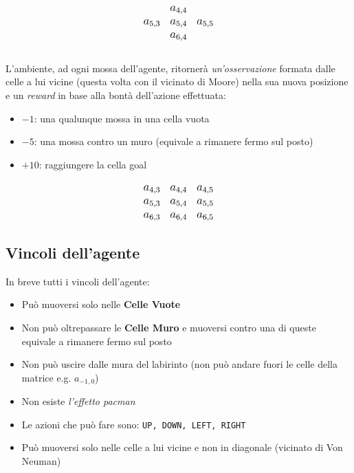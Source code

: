 \begin{equation*}
\large
\begin{matrix}
	\ & a_{4,4} & \ \\
	a_{5,3} & a_{5,4} & a_{5,5}\\
	\ & a_{6,4} & \ \\
\end{matrix}
\end{equation*}
\ \\
L'ambiente, ad ogni mossa dell'agente, ritorner\`{a}  \textit{un'osservazione} formata dalle celle a lui vicine (questa volta con il vicinato di Moore) nella sua nuova posizione e un \textit{reward} in base alla bont\`{a} dell'azione effettuata:

\begin{itemize}
	\item $-1$: una qualunque mossa in una cella vuota
	\item $-5$: una mossa contro un muro (equivale a rimanere fermo sul posto)
	\item $+10$: raggiungere la cella goal
\end{itemize}

\begin{equation*}
	\large
	\begin{matrix}
		a_{ 4,3} & a_{4,4} & a_{4,5} \\
		a_{5,3} & a_{5,4} & a_{5,5}\\
		a_{6,3} & a_{6,4} & a_{6,5} \\
	\end{matrix}
\end{equation*}

\subsection{Vincoli dell'agente}
In breve tutti i vincoli dell'agente:

\begin{itemize}
	\item Pu\`{o} muoversi solo nelle \textbf{Celle Vuote}
	\item Non pu\`{o} oltrepassare le \textbf{Celle Muro} e muoversi contro una di queste equivale a rimanere fermo sul posto
	\item Non pu\`{o} uscire dalle mura del labirinto (non pu\`{o} andare fuori le celle della matrice e.g. $a_{-1, 0}$)
	\item Non esiste \textit{l'effetto pacman}
	\item Le azioni che pu\`{o} fare sono: \lstinline[style=cmd]|UP, DOWN, LEFT, RIGHT|
	\item Pu\`{o} muoversi solo nelle celle a lui vicine e non in diagonale (vicinato di Von Neuman)
\end{itemize}


